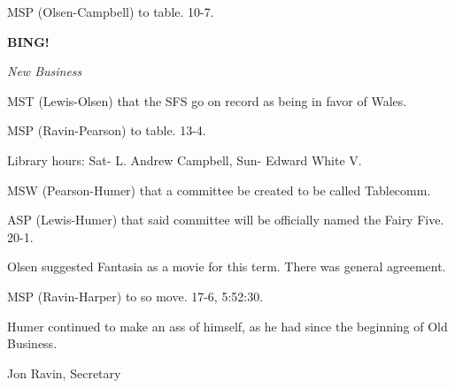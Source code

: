 \documentclass[12pt]{article}
\newcommand{\bing}{{\bf BING!} }
\newcommand{\goto}[1]{\bing \vskip 12pt \centerline{{\em{#1}}}}
\begin{document}
MSP (Olsen-Campbell) to table. 10-7.

\goto{New Business}

MST (Lewis-Olsen) that the SFS go on record as being in favor of Wales.

MSP (Ravin-Pearson) to table. 13-4.

Library hours: Sat- L. Andrew Campbell, Sun- Edward White V.

MSW (Pearson-Humer) that a committee be created to be called Tablecomm.

ASP (Lewis-Humer) that said committee will be officially named the Fairy Five. 20-1.

Olsen suggested Fantasia as a movie for this term. There was general agreement.

MSP (Ravin-Harper) to so move. 17-6, 5:52:30.

Humer continued to make an ass of himself, as he had since the beginning of Old Business.

\vspace{12pt}

\centerline{Jon Ravin, Secretary}
\end{document}
